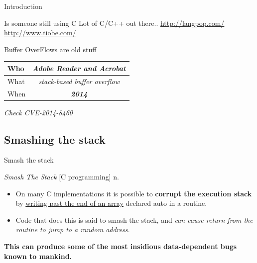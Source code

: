 \begin{frame}{Introduction}
\framebreak

\begin{block}{Is someone still using C}
Lot of C/C++ out there.. {\small \url{http://langpop.com/}  \url{http://www.tiobe.com/} }
\end{block}

\begin{block}{Buffer OverFlows are old stuff}
\begin{center}
\begin{tabular}{l|c}
\hline
Who  & \emph{Adobe Reader and Acrobat} \\
\hline
What & \emph{stack-based buffer overflow} \\
\hline
When & \emph{ \bf \color{red} 2014 } \\
\hline
\end{tabular}
\end{center}
\hfill \emph{Check CVE-2014-8460}
\end{block}

\end{frame}

\subsection{Smashing the stack}

\begin{frame}{Smash the stack}
\begin{block}{\emph{Smash The Stack} [C programming] n.}
\begin{itemize}
\item On many C implementations it is possible to {\bf corrupt the execution stack} by \underline{writing past the end of an array} declared auto in a routine.
\item Code that does this is said to smash the stack, and \emph{can cause return from the routine to jump to a random address}.
\end{itemize}
\begin{center}
\bf This can produce some of the most insidious data-dependent bugs known to mankind.
\end{center}
\end{block}
\end{frame}

